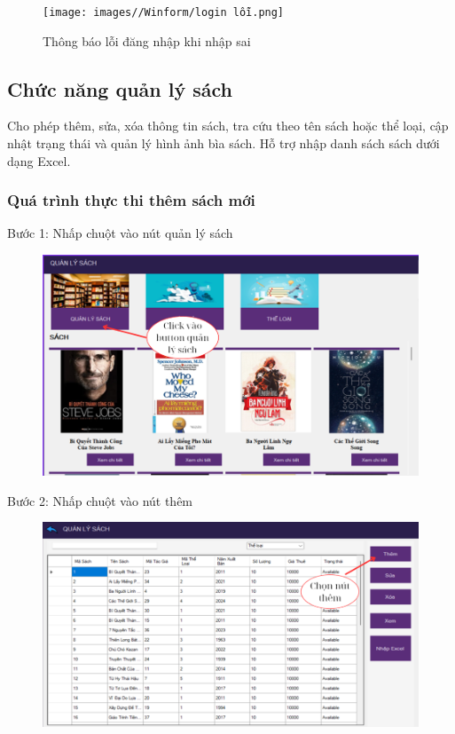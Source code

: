 \documentclass{article}
\begin{document}
\begin{figure} [H]
    \centering
    \texttt{[image: images//Winform/login lỗi.png]}
    \caption{Thông báo lỗi đăng nhập khi nhập sai}
    \label{fig:enter-label}
\end{figure}

\subsection{Chức năng quản lý sách}
Cho phép thêm, sửa, xóa thông tin sách, tra cứu theo tên sách hoặc thể loại, cập nhật trạng thái và quản lý hình ảnh bìa sách. Hỗ trợ nhập danh sách sách dưới dạng Excel.

\subsubsection{Quá trình thực thi thêm sách mới}
Bước 1: Nhấp chuột vào nút quản lý sách
\begin{figure} [H]
    \centering
    \includegraphics[width=0.8\linewidth]{images//Winform/thêm1.png}
    \label{fig:enter-label}
\end{figure}

Bước 2: Nhấp chuột vào nút thêm
\begin{figure} [H]
    \centering
    \includegraphics[width=0.8\linewidth]{images//Winform/thêm2.png}
    \label{fig:enter-label}
\end{figure}
\end{document}
